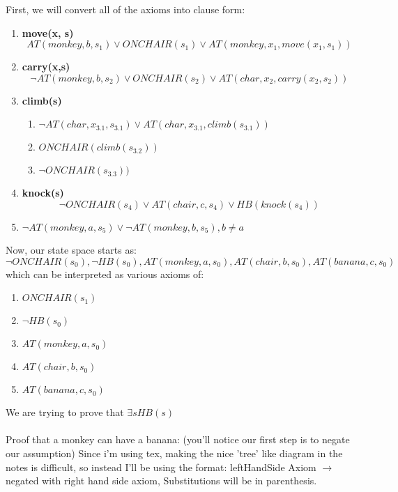 \documentclass[11pt]{article}
\begin{document}
First, we will convert all of the axioms into clause form: 
\begin{enumerate}[(1)]
\item \textbf{move(x, s)} \\
$$AT(monkey, b, s_1) \vee ONCHAIR(s_1) \vee AT(monkey, x_1, move(x_1, s_1))$$
\item \textbf{carry(x,s)}\\
$$\neg AT(monkey, b, s_2) \vee ONCHAIR(s_2) \vee AT(char, x_2, carry(x_2, s_2))$$
\item \textbf{climb(s)}\\
\begin{enumerate}[(3.1)]
\item $\neg AT(char, x_{3.1}, s_{3.1}) \vee AT(char, x_{3.1}, climb(s_{3.1}))$
\item $ ONCHAIR(climb(s_{3.2}))$
\item $\neg ONCHAIR(s_{3.3}))$
\end{enumerate}
\item \textbf{knock(s)}\\
$$ \neg ONCHAIR(s_4) \vee AT(chair, c, s_4) \vee HB(knock(s_4))$$
\item $\neg AT(monkey, a, s_5) \vee \neg AT(monkey, b, s_5), b \not = a$
\end{enumerate}
Now, our state space starts as: 
$$\neg ONCHAIR(s_0), \neg HB(s_0), AT(monkey, a, s_0), AT(chair, b, s_0), AT(banana, c, s_0)$$
which can be interpreted as various axioms of: 
\begin{enumerate}[(6.1)]
\item $ONCHAIR(s_1)$
\item $\neg HB(s_0)$
\item $AT(monkey, a, s_0)$
\item $AT(chair, b, s_0)$
\item $AT(banana, c, s_0)$
\end{enumerate}
We are trying to prove that $\exists s HB(s)$\\\\
Proof that a monkey can have a banana:  (you'll notice our first step is to negate our assumption)
Since i'm using tex, making the nice 'tree' like diagram in the notes is difficult, so instead I'll be using the format: leftHandSide Axiom $\rightarrow$ negated with right hand side axiom, Substitutions will be in parenthesis. \\
\end{document}
